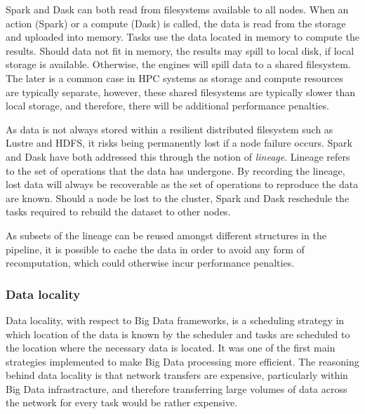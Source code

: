 \documentclass{report}
\begin{document}
                    Spark and Dask can both read from filesystems available to
                    all nodes. When an action (Spark) or a compute (Dask) is 
                    called, the data is read from the storage and uploaded into
                    memory. Tasks use the data located in memory to compute the
                    results. Should data not fit in memory, the results may 
                    spill to local disk, if local storage is available. 
                    Otherwise, the engines will spill data to a shared 
                    filesystem. The later is a common case in HPC systems as 
                    storage and compute resources are typically separate, 
                    however, these shared filesystems are typically slower than 
                    local storage, and therefore, there will be additional 
                    performance penalties.

                    As data is not always stored within a resilient distributed 
                    filesystem such as Lustre and HDFS, it risks being 
                    permanently lost if a node failure occurs. Spark and Dask
                    have both addressed this through the notion of 
                    \textit{lineage}. Lineage refers to the set of operations
                    that the data has undergone. By recording the lineage, lost
                    data will always be recoverable as the set of operations
                    to reproduce the data are known. Should a node be lost to 
                    the cluster, Spark and Dask reschedule the tasks required 
                    to rebuild the dataset to other nodes.

                    As subsets of the lineage can be reused amongst different
                    structures in the pipeline, it is possible to cache the 
                    data in order to avoid any form of recomputation, which 
                    could otherwise incur performance penalties.
                                      
 
                \subsubsection{Data locality}
                    Data locality, with respect to Big Data frameworks, is a
                    scheduling
                    strategy in which location of the data is known by the 
                    scheduler and tasks are scheduled to the location where the
                    necessary data is located. It was one of the first main 
                    strategies implemented to make Big Data processing more 
                    efficient. The reasoning behind data locality is that 
                    network transfers are expensive, particularly within 
                    Big Data infrastracture, and therefore transferring large 
                    volumes of data across the network for every task would be 
                    rather expensive.
\end{document}
